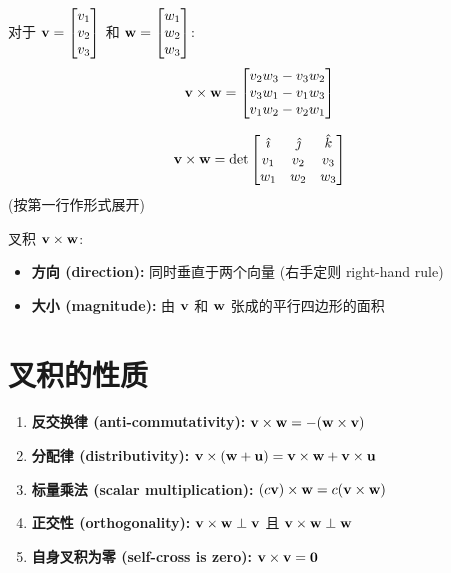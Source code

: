 \begin{definition}[三维叉积]
对于 $\mathbf{v} = \begin{bmatrix} v_1 \\ v_2 \\ v_3 \end{bmatrix}$ 和 $\mathbf{w} = \begin{bmatrix} w_1 \\ w_2 \\ w_3 \end{bmatrix}$:
\[
\mathbf{v} \times \mathbf{w} = \begin{bmatrix} v_2 w_3 - v_3 w_2 \\ v_3 w_1 - v_1 w_3 \\ v_1 w_2 - v_2 w_1 \end{bmatrix}
\]
\end{definition}

\begin{theorem}[行列式公式]
\[
\mathbf{v} \times \mathbf{w} = \det\begin{bmatrix} \hat{\imath} & \hat{\jmath} & \hat{k} \\ v_1 & v_2 & v_3 \\ w_1 & w_2 & w_3 \end{bmatrix}
\]
(按第一行作形式展开)
\end{theorem}

\begin{intuition}
叉积 $\mathbf{v} \times \mathbf{w}$:
\begin{itemize}
    \item \textbf{方向 (direction):} 同时垂直于两个向量 (右手定则 right-hand rule)
    \item \textbf{大小 (magnitude):} 由 $\mathbf{v}$ 和 $\mathbf{w}$ 张成的平行四边形的面积
\end{itemize}
\end{intuition}

\begin{center}
\end{center}

\section{叉积的性质}

\begin{theorem}[主要性质]
\begin{enumerate}
    \item \textbf{反交换律 (anti-commutativity):} $\mathbf{v} \times \mathbf{w} = -(\mathbf{w} \times \mathbf{v})$
    \item \textbf{分配律 (distributivity):} $\mathbf{v} \times (\mathbf{w} + \mathbf{u}) = \mathbf{v} \times \mathbf{w} + \mathbf{v} \times \mathbf{u}$
    \item \textbf{标量乘法 (scalar multiplication):} $(c\mathbf{v}) \times \mathbf{w} = c(\mathbf{v} \times \mathbf{w})$
    \item \textbf{正交性 (orthogonality):} $\mathbf{v} \times \mathbf{w} \perp \mathbf{v}$ 且 $\mathbf{v} \times \mathbf{w} \perp \mathbf{w}$
    \item \textbf{自身叉积为零 (self-cross is zero):} $\mathbf{v} \times \mathbf{v} = \mathbf{0}$
\end{enumerate}
\end{theorem}

